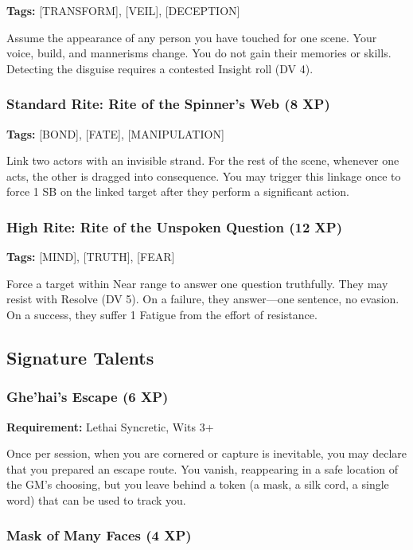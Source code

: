 \textbf{Tags:} [TRANSFORM], [VEIL], [DECEPTION]

Assume the appearance of any person you have touched for one scene. Your voice, build, and mannerisms change. You do not gain their memories or skills. Detecting the disguise requires a contested Insight roll (DV 4).

\subsubsection{Standard Rite: Rite of the Spinner's Web (8 XP)}

\textbf{Tags:} [BOND], [FATE], [MANIPULATION]

Link two actors with an invisible strand. For the rest of the scene, whenever one acts, the other is dragged into consequence. You may trigger this linkage once to force 1 SB on the linked target after they perform a significant action.

\subsubsection{High Rite: Rite of the Unspoken Question (12 XP)}

\textbf{Tags:} [MIND], [TRUTH], [FEAR]

Force a target within Near range to answer one question truthfully. They may resist with Resolve (DV 5). On a failure, they answer—one sentence, no evasion. On a success, they suffer 1 Fatigue from the effort of resistance.

\subsection{Signature Talents}

\subsubsection{Ghe'hai's Escape (6 XP)}

\textbf{Requirement:} Lethai Syncretic, Wits 3+

Once per session, when you are cornered or capture is inevitable, you may declare that you prepared an escape route. You vanish, reappearing in a safe location of the GM's choosing, but you leave behind a token (a mask, a silk cord, a single word) that can be used to track you.

\subsubsection{Mask of Many Faces (4 XP)}

